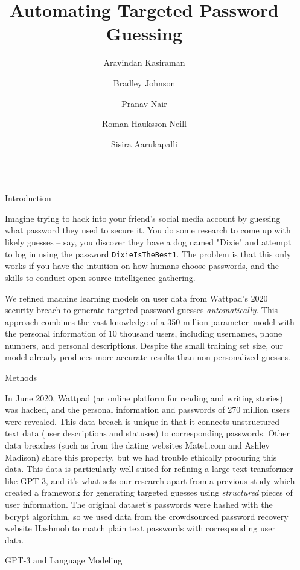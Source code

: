 \documentclass[final]{beamer}
\title{Automating Targeted Password Guessing}
\author{Aravindan Kasiraman \and Bradley Johnson \and Pranav Nair \and Roman Hauksson-Neill \and Sisira Aarukapalli }
\newlength{\sepwidth}
\newlength{\colwidth}
\newcommand{\separatorcolumn}{\begin{column}{\sepwidth}\end{column}}
\begin{document}
\begin{frame}[t]
\begin{columns}[t]
\separatorcolumn
\begin{column}{\colwidth}

  \begin{block}{Introduction}

Imagine trying to hack into your friend's social media account by guessing what password they used to secure it. You do some research to come up with likely guesses – say, you discover they have a dog named "Dixie" and attempt to log in using the password {\tt DixieIsTheBest1}. The problem is that this only works if you have the intuition on how humans choose passwords, and the skills to conduct open-source intelligence gathering.

We refined machine learning models on user data from Wattpad's 2020 security breach to generate targeted password guesses \emph{automatically}. This approach combines the vast knowledge of a 350 million parameter–model with the personal information of 10 thousand users, including usernames, phone numbers, and personal descriptions. Despite the small training set size, our model already produces more accurate results than non-personalized guesses.

  \end{block}

  \begin{block}{Methods}

    In June 2020, Wattpad (an online platform for reading and writing stories) was hacked, and the personal information and passwords of 270 million users were revealed. This data breach is unique in that it connects unstructured text data (user descriptions and statuses) to corresponding passwords. Other data breaches (such as from the dating websites Mate1.com and Ashley Madison) share this property, but we had trouble ethically procuring this data. This data is particularly well-suited for refining a large text transformer like GPT-3, and it's what sets our research apart from a previous study which created a framework for generating targeted guesses using \emph{structured} pieces of user information. The original dataset's passwords were hashed with the bcrypt algorithm, so we used data from the crowdsourced password recovery website Hashmob to match plain text passwords with corresponding user data.
    
    

  \begin{alertblock}{GPT-3 and Language Modeling}


\end{alertblock}
\end{block}
\end{column}
\end{columns}
\end{frame}
\end{document}
